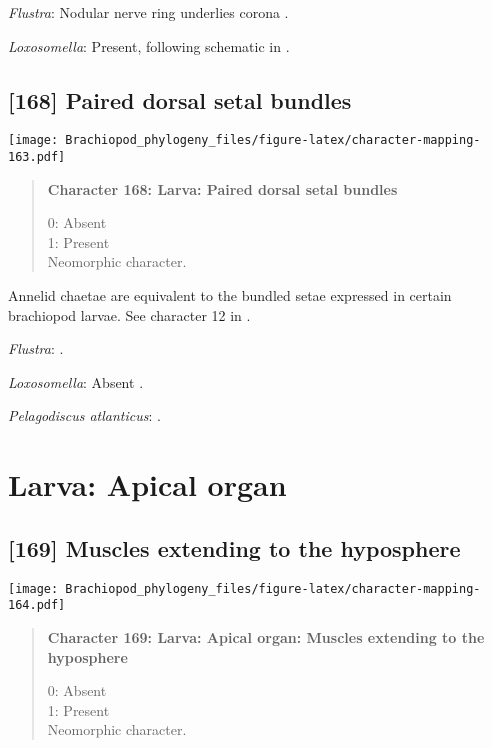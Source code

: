 \documentclass[openany]{book}
\theoremstyle{definition}
\theoremstyle{definition}
\theoremstyle{definition}
\theoremstyle{remark}
\begin{document}
\hypertarget{Flustra-coding-167}{}
\emph{Flustra}: Nodular nerve ring underlies corona \citep{Reed1982}.

\hypertarget{Loxosomella-coding-167}{}
\emph{Loxosomella}: Present, following schematic in \citet{Gruhl2016}.

\subsection*{{[}168{]} Paired dorsal setal
bundles}\label{paired-dorsal-setal-bundles}

\texttt{[image: Brachiopod\_phylogeny\_files/figure-latex/character-mapping-163.pdf]}

\begin{quote}
\textbf{Character 168: Larva: Paired dorsal setal bundles}

0: Absent\\
1: Present\\
Neomorphic character.
\end{quote}

Annelid chaetae are equivalent to the bundled setae expressed in certain
brachiopod larvae. See character 12 in \citet{Vinther2008}.

\hypertarget{Flustra-coding-168}{}
\emph{Flustra}: \citep{Reed1982}.

\hypertarget{Loxosomella-coding-168}{}
\emph{Loxosomella}: Absent \citep{Zimmer2013}.

\hypertarget{Pelagodiscus_atlanticus-coding-168}{}
\emph{Pelagodiscus atlanticus}: \citet{Williams1997Introduction}.

\section{Larva: Apical organ}\label{larva-apical-organ}

\subsection*{{[}169{]} Muscles extending to the
hyposphere}\label{muscles-extending-to-the-hyposphere}

\texttt{[image: Brachiopod\_phylogeny\_files/figure-latex/character-mapping-164.pdf]}

\begin{quote}
\textbf{Character 169: Larva: Apical organ: Muscles extending to the
hyposphere}

0: Absent\\
1: Present\\
Neomorphic character.
\end{quote}
\end{document}
